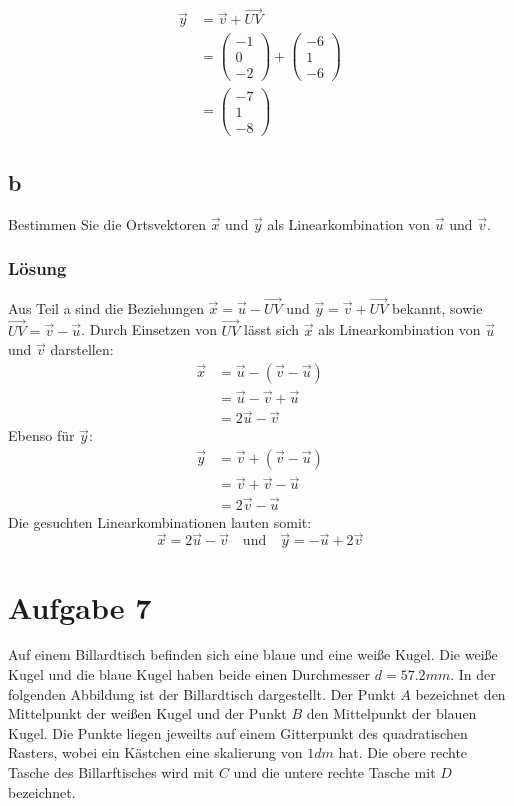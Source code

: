 \begin{align*}
    \vec{y} &= \vec{v} + \vec{UV} \\
    &= \begin{pmatrix}
        -1 \\ 0 \\ -2
    \end{pmatrix} + \begin{pmatrix}
        -6 \\ 1 \\ -6
    \end{pmatrix} \\
    &= \begin{pmatrix}
        -7 \\ 1 \\ -8
    \end{pmatrix}
\end{align*}

\subsection{b}

Bestimmen Sie die Ortsvektoren $\vec{x}$ und $\vec{y}$ als Linearkombination von $\vec{u}$ und $\vec{v}$.

\subsubsection*{Lösung}
Aus Teil a sind die Beziehungen $\vec{x} = \vec{u} - \vec{UV}$ und $\vec{y} = \vec{v} + \vec{UV}$ bekannt, sowie $\vec{UV} = \vec{v} - \vec{u}$. Durch Einsetzen von $\vec{UV}$ lässt sich $\vec{x}$ als Linearkombination von $\vec{u}$ und $\vec{v}$ darstellen:
\begin{align*}
    \vec{x} &= \vec{u} - (\vec{v} - \vec{u}) \\
    &= \vec{u} - \vec{v} + \vec{u} \\
    &= 2\vec{u} - \vec{v}
\end{align*}
Ebenso für $\vec{y}$:
\begin{align*}
    \vec{y} &= \vec{v} + (\vec{v} - \vec{u}) \\
    &= \vec{v} + \vec{v} - \vec{u} \\
    &= 2\vec{v} - \vec{u}
\end{align*}
Die gesuchten Linearkombinationen lauten somit:
\[
    \vec{x} = 2\vec{u} - \vec{v} \quad \text{und} \quad \vec{y} = - \vec{u} + 2\vec{v}
\]

\section{Aufgabe 7}

Auf einem Billardtisch befinden sich eine blaue und eine weiße Kugel. Die weiße Kugel und die blaue Kugel haben beide einen Durchmesser $d = 57.2mm$. In der folgenden Abbildung ist der Billardtisch dargestellt. Der Punkt $A$ bezeichnet den Mittelpunkt der weißen Kugel und der Punkt $B$ den Mittelpunkt der blauen Kugel. Die Punkte liegen jeweilts auf einem Gitterpunkt des quadratischen Rasters, wobei ein Kästchen eine skalierung von $1dm$ hat. Die obere rechte Tasche des Billarftisches wird mit $C$ und die untere rechte Tasche mit $D$ bezeichnet.